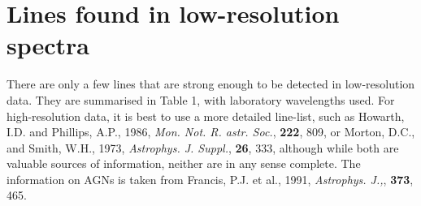 \section{Lines found in low-resolution spectra}

There are only a few lines that are strong enough to be detected in 
low-resolution data. They are summarised in Table 1, with laboratory 
wavelengths used. For high-resolution data, it is best to use a more detailed 
line-list, such as Howarth, I.D. and Phillips, A.P., 1986, {\it Mon. Not. R. 
astr. Soc.}, {\bf 222}, 809, or Morton, D.C., and Smith, W.H., 1973, 
{\it Astrophys. J. Suppl.}, {\bf 26}, 333, although while both are valuable 
sources of information, neither are in any sense complete. The information on 
AGNs is taken from Francis, P.J. et al., 1991, {\it Astrophys. J.,}, {\bf 373}, 
465. 


